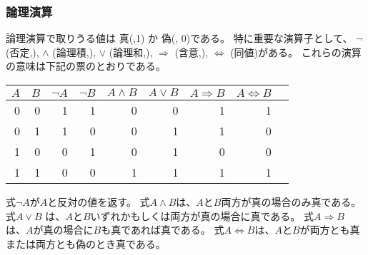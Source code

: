 \subsubsection{論理演算}


\begin{comment}
The value of a logical expression is either
\key{true} (1) or \key{false} (0).
The most important logical operators are
$\lnot$ (\key{negation}),
$\land$ (\key{conjunction}),
$\lor$ (\key{disjunction}),
$\Rightarrow$ (\key{implication}) and
$\Leftrightarrow$ (\key{equivalence}).
The following table shows the meanings of these operators:
\end{comment}

論理演算で取りうる値は
真(,1) か 偽(, 0)である。
特に重要な演算子として、
$\lnot$ (否定,),
$\land$ (論理積,),
$\lor$ (論理和,),
$\Rightarrow$ (含意,),
$\Leftrightarrow$ (同値)がある。
これらの演算の意味は下記の票のとおりである。

\begin{center}
\begin{tabular}{rr|rrrrrrr}
$A$ & $B$ & $\lnot A$ & $\lnot B$ & $A \land B$ & $A \lor B$ & $A \Rightarrow B$ & $A \Leftrightarrow B$ \\
\hline
0 & 0 & 1 & 1 & 0 & 0 & 1 & 1 \\
0 & 1 & 1 & 0 & 0 & 1 & 1 & 0 \\
1 & 0 & 0 & 1 & 0 & 1 & 0 & 0 \\
1 & 1 & 0 & 0 & 1 & 1 & 1 & 1 \\
\end{tabular}
\end{center}

\begin{comment}
The expression $\lnot A$ has the opposite value of $A$.
The expression $A \land B$ is true if both $A$ and $B$
are true,
and the expression $A \lor B$ is true if $A$ or $B$ or both
are true.
The expression $A \Rightarrow B$ is true
if whenever $A$ is true, also $B$ is true.
The expression $A \Leftrightarrow B$ is true
if $A$ and $B$ are both true or both false.
\end{comment}

式$\lnot A$が$A$と反対の値を返す。
式$A \land B$は、$A$と$B$両方が真の場合のみ真である。
式$A \lor B$ は、$A$と$B$いずれかもしくは両方が真の場合に真である。
式$A \Rightarrow B$ は、$A$が真の場合に$B$も真であれば真である。
式$A \Leftrightarrow B$は、$A$と$B$が両方とも真または両方とも偽のとき真である。

